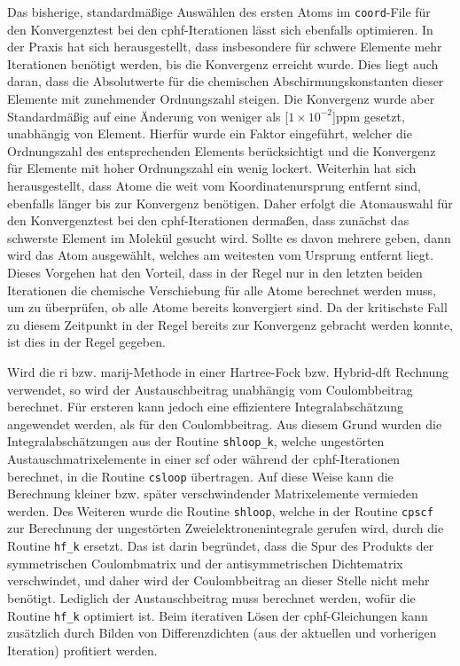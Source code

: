 \bigskip
Das bisherige, standardmäßige Auswählen des ersten Atoms im \texttt{coord}-File für den Konvergenztest bei den \ac{cphf}-Iterationen lässt sich ebenfalls optimieren. In der Praxis hat sich herausgestellt, dass insbesondere für schwere Elemente mehr Iterationen benötigt werden, bis die Konvergenz erreicht wurde. Dies liegt auch daran, dass die Absolutwerte für die chemischen Abschirmungskonstanten dieser Elemente mit zunehmender Ordnungszahl steigen. Die Konvergenz wurde aber Standardmäßig auf eine Änderung von weniger als \unit[$1\times 10^{-2}$]{ppm} gesetzt, unabhängig von Element. Hierfür wurde ein Faktor eingeführt, welcher die Ordnungszahl des entsprechenden Elements berücksichtigt und die Konvergenz für Elemente mit hoher Ordnungszahl ein wenig lockert. Weiterhin hat sich herausgestellt, dass Atome die weit vom Koordinatenursprung entfernt sind, ebenfalls länger bis zur Konvergenz benötigen. Daher erfolgt die Atomauswahl für den Konvergenztest bei den \ac{cphf}-Iterationen dermaßen, dass zunächst das schwerste Element im Molekül gesucht wird. Sollte es davon mehrere geben, dann wird das Atom ausgewählt, welches am weitesten vom Ursprung entfernt liegt. Dieses Vorgehen hat den Vorteil, dass in der Regel nur in den letzten beiden Iterationen die chemische Verschiebung für alle Atome berechnet werden muss, um zu überprüfen, ob alle Atome bereits konvergiert sind. Da der kritischste Fall zu diesem Zeitpunkt in der Regel bereits zur Konvergenz gebracht werden konnte, ist dies in der Regel gegeben.

\bigskip
Wird die \ac{ri} bzw. \ac{marij}-Methode in einer Hartree-Fock bzw. Hybrid-\ac{dft} Rechnung verwendet, so wird der Austauschbeitrag unabhängig vom Coulombbeitrag berechnet. Für ersteren kann jedoch eine effizientere Integralabschätzung\supercite{ochsenfeld1998linear} angewendet werden, als für den Coulombbeitrag. Aus diesem Grund wurden die Integralabschätzungen aus der Routine \texttt{shloop\_k}, welche ungestörten Austauschmatrixelemente in einer \ac{scf} oder während der \ac{cphf}-Iterationen berechnet, in die Routine \texttt{csloop} übertragen. Auf diese Weise kann die Berechnung kleiner bzw. später verschwindender Matrixelemente vermieden werden. Des Weiteren wurde die Routine \texttt{shloop}, welche in der Routine \texttt{cpscf} zur Berechnung der ungestörten Zweielektronenintegrale gerufen wird, durch die Routine \texttt{hf\_k} ersetzt. Das ist darin begründet, dass die Spur des Produkts der symmetrischen Coulombmatrix und der antisymmetrischen Dichtematrix verschwindet, und daher wird der Coulombbeitrag an dieser Stelle nicht mehr benötigt. Lediglich der Austauschbeitrag muss berechnet werden, wofür die Routine \texttt{hf\_k} optimiert ist. Beim iterativen Lösen der \ac{cphf}-Gleichungen kann zusätzlich durch Bilden von Differenzdichten (aus der aktuellen und vorherigen Iteration) profitiert werden. 

